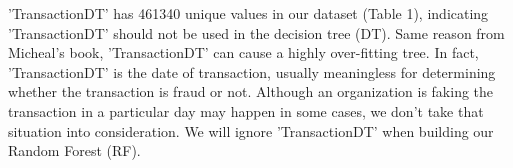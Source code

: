 \documentclass{article}
\begin{document}
\begin{table}[H]
    \centering
    \caption{\label{tab:1} Data overview}
\end{table}
'TransactionDT' has 461340 unique values in our dataset (Table 1), indicating 'TransactionDT' should not be used in the decision tree (DT). Same reason from Micheal's book, 'TransactionDT' can cause a highly over-fitting tree. In fact, 'TransactionDT' is the date of transaction, usually meaningless for determining whether the transaction is fraud or not. Although an organization is faking the transaction in a particular day may happen in some cases, we don't take that situation into consideration. We will ignore 'TransactionDT' when building our Random Forest (RF).
\end{document}
